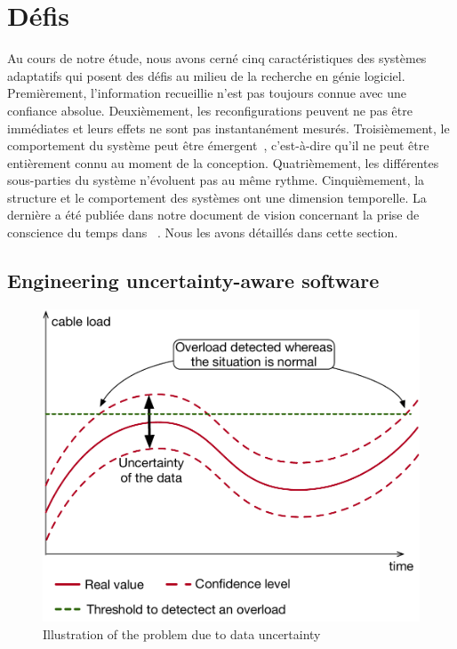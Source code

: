 \section{Défis}

%
Au cours de notre étude, nous avons cerné cinq caractéristiques des systèmes adaptatifs qui posent des défis au milieu de la recherche en génie logiciel. 
Premièrement, l'information recueillie n'est pas toujours connue avec une confiance absolue. 
Deuxièmement, les reconfigurations peuvent ne pas être immédiates et leurs effets ne sont pas instantanément mesurés. Troisièmement, le comportement du système peut être émergent~\cite{zio2011uncertainties}, c'est-à-dire qu'il ne peut être entièrement connu au moment de la conception. 
Quatrièmement, les différentes sous-parties du système n'évoluent pas au même rythme. 
Cinquièmement, la structure et le comportement des systèmes ont une dimension temporelle. 
La dernière a été publiée dans notre document de vision concernant la prise de conscience du temps dans ~\cite{DBLP:conf/models/Benelallam0MFBB17}. 
Nous les avons détaillés dans cette section.

\subsection{Engineering uncertainty-aware software}

\begin{figure}
	\centering
	\includegraphics[width=.6\linewidth]{img/chapt-intro/challenges/duc}
	\caption{Illustration of the problem due to data uncertainty}
	\label{fig:french:chal:duc}
\end{figure}

